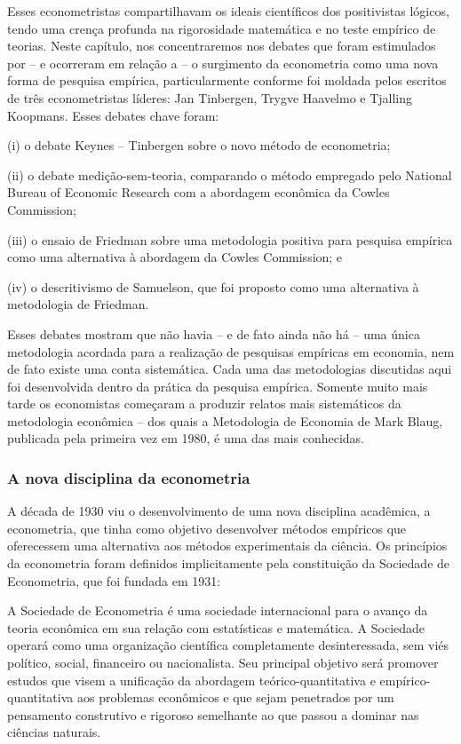 \documentclass[12pt]{article}
\begin{document}
Esses econometristas compartilhavam os ideais científicos dos positivistas lógicos,
tendo uma crença profunda na rigorosidade matemática e no teste empírico
de teorias. Neste capítulo, nos concentraremos nos debates que foram
estimulados por – e ocorreram em relação a – o surgimento da econometria
como uma nova forma de pesquisa empírica, particularmente conforme foi moldada
pelos escritos de três econometristas líderes: Jan Tinbergen, Trygve
Haavelmo e Tjalling Koopmans. Esses debates chave foram:

(i) o debate Keynes – Tinbergen sobre o novo método de econometria;

(ii) o debate medição-sem-teoria, comparando o método
empregado pelo National Bureau of Economic Research com a
abordagem econômica da Cowles Commission;

(iii) o ensaio de Friedman sobre uma metodologia positiva para pesquisa empírica
como uma alternativa à abordagem da Cowles Commission; e

(iv) o descritivismo de Samuelson, que foi proposto como uma alternativa à
metodologia de Friedman.

Esses debates mostram que não havia – e de fato ainda não há – uma única metodologia acordada para a realização de pesquisas empíricas em economia, nem de fato existe uma conta sistemática. Cada uma das metodologias discutidas aqui foi desenvolvida dentro da prática da pesquisa empírica. Somente muito mais tarde os economistas começaram a produzir relatos mais sistemáticos da metodologia econômica – dos quais a Metodologia de Economia de Mark Blaug, publicada pela primeira vez em 1980, é uma das mais conhecidas.

\subsubsection{\textbf{A nova disciplina da econometria}}
A década de 1930 viu o desenvolvimento de uma nova disciplina acadêmica, a econometria, que tinha como objetivo desenvolver métodos empíricos que oferecessem uma alternativa aos métodos experimentais da ciência. Os princípios da econometria foram definidos implicitamente pela constituição da Sociedade de Econometria, que foi fundada em 1931:

A Sociedade de Econometria é uma sociedade internacional para o avanço da teoria econômica em sua relação com estatísticas e matemática. A Sociedade operará como uma organização científica completamente desinteressada, sem viés político, social, financeiro ou nacionalista. Seu principal objetivo será promover estudos que visem a unificação da abordagem teórico-quantitativa e empírico-quantitativa aos problemas econômicos e que sejam penetrados por um pensamento construtivo e rigoroso semelhante ao que passou a dominar nas ciências naturais.
\end{document}
